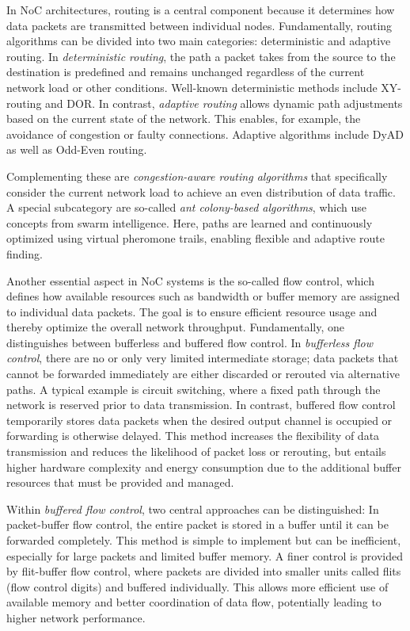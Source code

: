 In NoC architectures, routing is a central component because it determines how data packets are transmitted between individual nodes. Fundamentally, routing algorithms can be divided into two main categories: deterministic and adaptive routing. In \textit{deterministic routing}, the path a packet takes from the source to the destination is predefined and remains unchanged regardless of the current network load or other conditions. Well-known deterministic methods include XY-routing and \ac{DOR}.\cite{ma_summary_2024} In contrast, \textit{adaptive routing} allows dynamic path adjustments based on the current state of the network. This enables, for example, the avoidance of congestion or faulty connections. Adaptive algorithms include \ac{DyAD}\cite{hu_dyad_2004} as well as Odd-Even routing.

Complementing these are \textit{congestion-aware routing algorithms} that specifically consider the current network load to achieve an even distribution of data traffic.\cite{fang_parrouting_2020} A special subcategory are so-called \textit{ant colony-based algorithms}, which use concepts from swarm intelligence. Here, paths are learned and continuously optimized using virtual pheromone trails, enabling flexible and adaptive route finding.\cite{luneque_routing_2013}


Another essential aspect in NoC systems is the so-called flow control, which defines how available resources such as bandwidth or buffer memory are assigned to individual data packets. The goal is to ensure efficient resource usage and thereby optimize the overall network throughput. Fundamentally, one distinguishes between bufferless and buffered flow control. In \textit{bufferless flow control}, there are no or only very limited intermediate storage; data packets that cannot be forwarded immediately are either discarded or rerouted via alternative paths. A typical example is circuit switching, where a fixed path through the network is reserved prior to data transmission. In contrast, buffered flow control temporarily stores data packets when the desired output channel is occupied or forwarding is otherwise delayed. This method increases the flexibility of data transmission and reduces the likelihood of packet loss or rerouting, but entails higher hardware complexity and energy consumption due to the additional buffer resources that must be provided and managed.

Within \textit{buffered flow control}, two central approaches can be distinguished: In packet-buffer flow control, the entire packet is stored in a buffer until it can be forwarded completely. This method is simple to implement but can be inefficient, especially for large packets and limited buffer memory. A finer control is provided by flit-buffer flow control, where packets are divided into smaller units called flits (flow control digits) and buffered individually. This allows more efficient use of available memory and better coordination of data flow, potentially leading to higher network performance.

